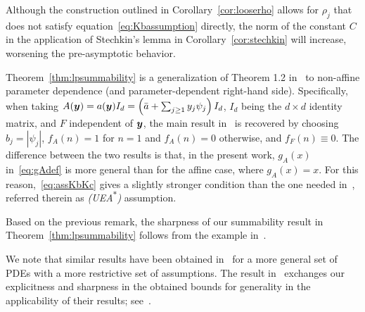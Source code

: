 Although the construction outlined in Corollary~\ref{cor:looserho} allows for $\rho_j$ that does not satisfy equation~\eqref{eq:Kbassumption} directly, the norm of the constant $C$ in the application of Stechkin's lemma in Corollary~\ref{cor:stechkin} will increase, worsening the pre-asymptotic behavior.

\begin{remark}
	Theorem~\ref{thm:lpsummability} is a generalization of Theorem 1.2 in~\cite{bachmayr2017a} to non-affine parameter dependence (and parameter-dependent right-hand side).
	Specifically, when taking $A({\bm{y}})= a({\bm{y}})I_d = \left(\bar{a} + \sum_{j \geq 1} y_j \psi_j\right)I_d$, $I_d$ being the $d\times d$ identity matrix, and $F$ independent of ${\bm{y}}$, the main result in~\cite{bachmayr2017a} is recovered by choosing $b_j=|\psi_j|$, $f_A(n)=1$ for $n=1$ and $f_A(n)=0$ otherwise, and $f_F(n)\equiv 0$.
	The difference between the two results is that, in the present work, $g_A(x)$ in~\eqref{eq:gAdef} is more general than for the affine case, where $g_A(x)=x$.
	For this reason,~\eqref{eq:assKbKc} gives a slightly stronger condition than the one needed in~\cite{bachmayr2017a}, referred therein as \emph{(UEA\textsuperscript{$\ast$})} assumption.
\end{remark}

\begin{remark}
	Based on the previous remark, the sharpness of our summability result in Theorem~\ref{thm:lpsummability} follows from the example in~\cite[Sect. 4.2]{bachmayr2017a}.
\end{remark}

\begin{remark}
	We note that similar results have been obtained in~\cite{zech2018} for a more general set of PDEs with a more restrictive set of assumptions.
	The result in~\cite{zech2018} exchanges our explicitness and sharpness in the obtained bounds for generality in the applicability of their results; see~\cite[Remark~2.3.8]{zech2018}.
\end{remark}
